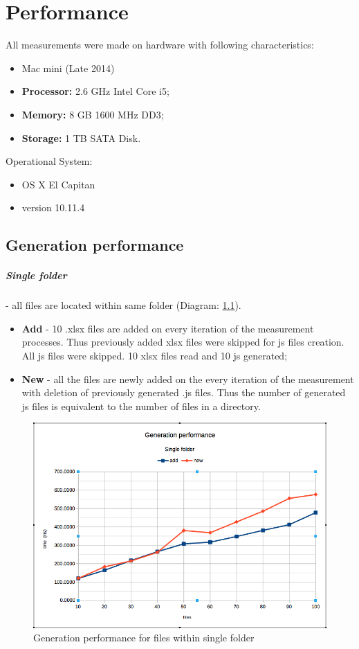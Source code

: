 \chapter{Performance}
\label{chap:perfux}
All measurements were made on hardware with following characteristics:
\begin{itemize}
	\item Mac mini (Late 2014)
	\item \textbf{Processor:} 2.6 GHz Intel Core i5;
	\item \textbf{Memory:} 8 GB 1600 MHz DD3;
	\item \textbf{Storage:}  1 TB SATA Disk.
\end{itemize}

Operational System:
\begin{itemize}
	\item OS X El Capitan
	\item version 10.11.4
\end{itemize}


\section{Generation performance}
\paragraph{Single folder} - all files are located within same folder (Diagram: \ref{fig:gs}).
\begin{itemize}
	\item \textbf{Add} - 10 .xlsx files are added on every iteration of the measurement processes. Thus previously added xlsx files were skipped for js files creation. All js files were skipped. 10 xlsx files read and 10 js generated;
	\item \textbf{New} - all the files are newly added on the every iteration of the measurement with deletion of previously generated .js files. Thus the number of generated js files is equivalent to the number of files in a directory.
\end{itemize}


\begin{figure}[ht]
	\label{fig:gs}
	\centering
	\includegraphics[width=\textwidth]{grafiken/generation_single}
	\caption{Generation performance for files within single folder}
\end{figure}

